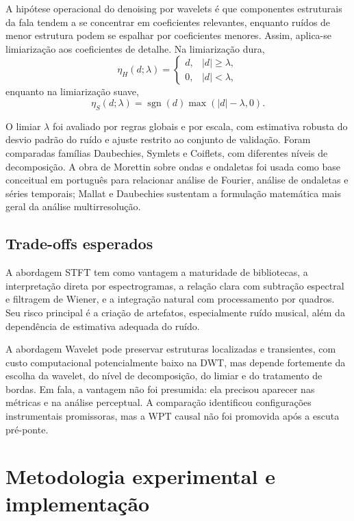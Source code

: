 A hipótese operacional do denoising por wavelets é que componentes estruturais da fala tendem a se concentrar em coeficientes relevantes, enquanto ruídos de menor estrutura podem se espalhar por coeficientes menores. Assim, aplica-se limiarização aos coeficientes de detalhe. Na limiarização dura,
\begin{equation}
    \eta_H(d;\lambda) =
    \begin{cases}
        d, & |d| \geq \lambda,\\
        0, & |d| < \lambda,
    \end{cases}
\end{equation}
enquanto na limiarização suave,
\begin{equation}
    \eta_S(d;\lambda) =
    \operatorname{sgn}(d)\max(|d|-\lambda,0).
\end{equation}

O limiar \(\lambda\) foi avaliado por regras globais e por escala, com estimativa robusta do desvio padrão do ruído e ajuste restrito ao conjunto de validação. Foram comparadas famílias Daubechies, Symlets e Coiflets, com diferentes níveis de decomposição. A obra de Morettin sobre ondas e ondaletas foi usada como base conceitual em português para relacionar análise de Fourier, análise de ondaletas e séries temporais; Mallat e Daubechies sustentam a formulação matemática mais geral da análise multirresolução.

\subsection{Trade-offs esperados}

A abordagem STFT tem como vantagem a maturidade de bibliotecas, a interpretação direta por espectrogramas, a relação clara com subtração espectral e filtragem de Wiener, e a integração natural com processamento por quadros. Seu risco principal é a criação de artefatos, especialmente ruído musical, além da dependência de estimativa adequada do ruído.

A abordagem Wavelet pode preservar estruturas localizadas e transientes, com custo computacional potencialmente baixo na DWT, mas depende fortemente da escolha da wavelet, do nível de decomposição, do limiar e do tratamento de bordas. Em fala, a vantagem não foi presumida: ela precisou aparecer nas métricas e na análise perceptual. A comparação identificou configurações instrumentais promissoras, mas a WPT causal não foi promovida após a escuta pré-ponte.

\section{Metodologia experimental e implementação}

